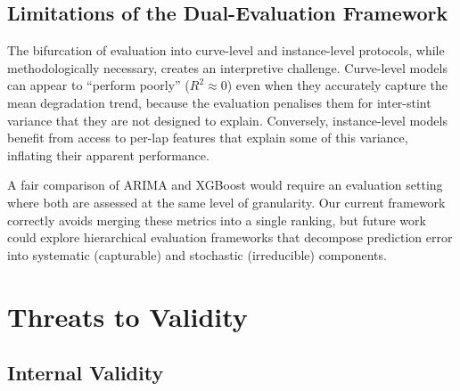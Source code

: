 \documentclass[journal,twoside]{IEEEtran}
\begin{document}
\subsection{Limitations of the Dual-Evaluation Framework}

The bifurcation of evaluation into curve-level and instance-level
protocols, while methodologically necessary, creates an interpretive
challenge.  Curve-level models can appear to ``perform poorly''
($R^{2} \approx 0$) even when they accurately capture the mean
degradation trend, because the evaluation penalises them for inter-stint
variance that they are not designed to explain.  Conversely,
instance-level models benefit from access to per-lap features that
explain some of this variance, inflating their apparent performance.

A fair comparison of ARIMA and XGBoost would require an evaluation
setting where both are assessed at the same level of granularity.
Our current framework correctly avoids merging these metrics into a
single ranking, but future work could explore hierarchical evaluation
frameworks that decompose prediction error into systematic (capturable)
and stochastic (irreducible) components.

\section{Threats to Validity}\label{sec:threats}

\subsection{Internal Validity}
\end{document}
